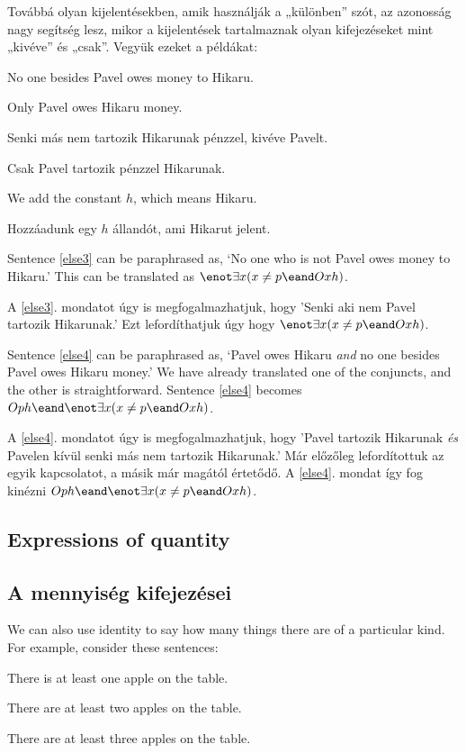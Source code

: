 Továbbá olyan kijelentésekben, amik használják a „különben” szót, az azonosság nagy segítség lesz, mikor a kijelentések tartalmaznak olyan kifejezéseket mint „kivéve” és „csak”. Vegyük ezeket a példákat:

\begin{earg}
\item[\ex{else3}] No one besides Pavel owes money to Hikaru.
\item[\ex{else4}] Only Pavel owes Hikaru money.
\end{earg}

\begin{earg}
\item[\ex{else3}] Senki más nem tartozik Hikarunak pénzzel, kivéve Pavelt.
\item[\ex{else4}] Csak Pavel tartozik pénzzel Hikarunak.
\end{earg}



We add the constant $h$, which means Hikaru.

Hozzáadunk egy $h$ állandót, ami Hikarut jelent.

Sentence \ref{else3} can be paraphrased as, `No one who is not Pavel owes money to Hikaru.' This can be translated as $\enot\exists x(x\neq p \eand Oxh)$.

A \ref{else3}. mondatot úgy is megfogalmazhatjuk, hogy 'Senki aki nem Pavel tartozik Hikarunak.' Ezt lefordíthatjuk úgy hogy $\enot\exists x(x\neq p \eand Oxh)$.

Sentence \ref{else4} can be paraphrased as, `Pavel owes Hikaru \emph{and} no one besides Pavel owes Hikaru money.' We have already translated one of the conjuncts, and the other is straightforward. Sentence \ref{else4} becomes $Oph \eand \enot\exists x(x\neq p \eand Oxh)$.

A \ref{else4}. mondatot úgy is megfogalmazhatjuk, hogy 'Pavel tartozik Hikarunak \emph{és} Pavelen kívül senki más nem tartozik Hikarunak.' Már előzőleg lefordítottuk az egyik kapcsolatot, a másik már magától értetődő. A \ref{else4}. mondat így fog kinézni $Oph \eand \enot\exists x(x\neq p \eand Oxh)$.


\subsection*{Expressions of quantity}
\subsection{A mennyiség kifejezései}
We can also use identity to say how many things there are of a particular kind. For example, consider these sentences:
\begin{earg}
\item[\ex{atleast1}] There is at least one apple on the table.
\item[\ex{atleast2}] There are at least two apples on the table.
\item[\ex{atleast3}] There are at least three apples on the table.
\end{earg}

